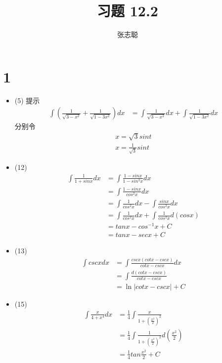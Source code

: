 \documentclass{article}
\begin{document}
\title{习题 12.2}
\author{张志聪}
\maketitle

\section*{1}

\begin{itemize}
  \item (5)
        提示
        \begin{align*}
          \int \left(\frac{1}{\sqrt{3 - x^2}} + \frac{1}{\sqrt{1-3x^2}} \right) dx
           & = \int \frac{1}{\sqrt{3 - x^2}} dx + \int \frac{1}{\sqrt{1-3x^2}} dx
        \end{align*}
        分别令
        \begin{align*}
          x = \sqrt{3} sin t \\
          x = \frac{1}{\sqrt{3}} sin t
        \end{align*}

  \item (12)
        \begin{align*}
          \int \frac{1}{1 + sin x} dx
           & = \int \frac{1 - sinx}{1 - sin^2 x} dx                      \\
           & = \int \frac{1 - sin x}{cos^2 x} dx                         \\
           & = \int \frac{1}{cos^2x} dx - \int \frac{sin x}{cos^2 x} dx  \\
           & = \int \frac{1}{cos^2x} dx + \int \frac{1}{cos^2 x} d(cosx) \\
           & = tan x - cos^{-1} x + C                                    \\
           & = tan x - sec x + C
        \end{align*}

  \item (13)
        \begin{align*}
          \int csc x dx
           & = \int \frac{cscx (cot x - csc x)}{cot x - csc x} dx \\
           & = \int \frac{d(cot x - csc x)}{cot x - csc x}        \\
           & = \ln |cot x - csc x| + C
        \end{align*}

  \item (15)
        \begin{align*}
          \int \frac{x}{4 + x^4} dx
           & = \frac{1}{4} \int \frac{x}{1 + (\frac{x^2}{2})^2}                 \\
           & = \frac{1}{4} \int \frac{1}{1 + (\frac{x^2}{2})^2}d(\frac{x^2}{2}) \\
           & = \frac{1}{4} tan \frac{x^2}{2} + C
        \end{align*}


\end{itemize}
\end{document}
